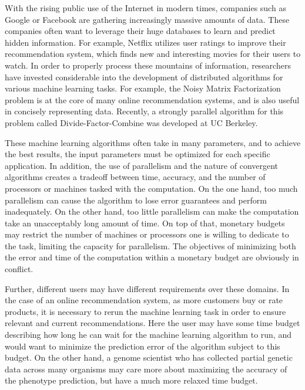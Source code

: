 With the rising public use of the Internet in modern times, companies 
such as Google or Facebook are gathering increasingly massive amounts 
of data. These companies often want to leverage their huge databases to 
learn and predict hidden information. For example, Netflix utilizes user 
ratings to improve their recommendation system, which finds new and 
interesting movies for their users to watch. In order to properly 
process these mountains of information, researchers have invested
considerable into the development of distributed algorithms for 
various machine learning tasks. For example, the Noisy Matrix Factorization 
problem is at the core of many online recommendation systems, and is
also useful in concisely representing data. Recently, a strongly parallel 
algorithm for this problem called Divide-Factor-Combine was developed 
at UC Berkeley\cite{MTJ13}. 

These machine learning algorithms often take in many parameters, and
to achieve the best results, the input parameters must be optimized for
each specific application. In addition, the use of parallelism and the
nature of convergent algorithms creates a tradeoff between time, accuracy,
and the number of processors or machines tasked with the computation. 
On the one hand, too much parallelism can cause the algorithm to lose 
error guarantees and perform inadequately. On the other hand, too 
little parallelism can make the computation take an unacceptably long 
amount of time. On top of that, monetary budgets may restrict the number
of machines or processors one is willing to dedicate to the task, limiting
the capacity for parallelism. The objectives of minimizing both the error 
and time of the computation within a monetary budget are obviously 
in conflict.

Further, different users may have different requirements over these 
domains. In the case of an online recommendation system, as more 
customers buy or rate products, it is necessary to rerun the machine 
learning task in order to ensure relevant and current recommendations. 
Here the user may have some time budget describing how long he can wait 
for the machine learning algorithm to run, and would want to minimize 
the prediction error of the algorithm subject to this budget. On the other
hand, a genome scientist who has collected partial genetic data 
across many organisms may care more about maximizing the accuracy of the
phenotype prediction, but have a much more relaxed time budget. 

